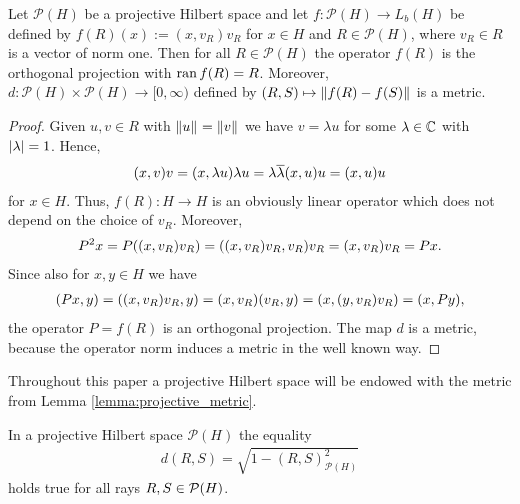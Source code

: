 \begin{lemma} \label{lemma:projective_metric}
	Let $\mathcal{P}(H)$ be a projective Hilbert space and let $f: \mathcal{P}(H) \to L_b(H)$ be defined by $f(R)(x) := (x,v_R)v_R$ for $x \in H$ and $R \in \mathcal{P}(H)$, where $v_R \in R$ is a vector of norm one. Then for all $R \in \mathcal{P}(H)$ the operator $f(R)$ is the orthogonal projection with $\operatorname{ran} f(R) = R$. Moreover, $d: \mathcal{P}(H) \times \mathcal{P}(H) \to [0, \infty)$ defined by $(R,S) \mapsto {\left \| f(R) - f(S) \right \|}_{}$ is a metric. 
\end{lemma}

\begin{proof}
	Given $u,v \in R$ with ${\left \| u \right \|}_{} = {\left \| v \right \|}_{}$ we have $v = \lambda u$ for some $\lambda \in \mathbb{C}$ with ${\left | \lambda \right |} = 1$. Hence,
	\begin{align*}
		{\left ( x,v \right )}v = {\left ( x, \lambda u \right )} \lambda u = \lambda \overline{\lambda} {\left ( x, u \right )} u = {\left ( x, u \right )} u 
	\end{align*}
	for $x \in H$. Thus, $f(R): H \to H$ is an obviously linear operator which does not depend on the choice of $v_R$. Moreover,
	\begin{align*}
		P^2x = P{\left ( (x, v_R) v_R \right )} = {\left ( (x, v_R) v_R, v_R \right )} v_R = (x,v_R) v_R = Px.
	\end{align*}
	Since also for $x,y \in H$ we have
	\begin{align*}
		(Px, y) = {\left ( (x, v_R) v_R, y \right )} = (x, v_R) (v_R, y) = {\left ( x, (y, v_R) v_R \right )} = (x, Py),
	\end{align*}
	the operator $P = f(R)$ is an orthogonal projection. The map $d$ is a metric, because the operator norm induces a metric in the well known way. 
\end{proof}


\begin{remark}
	Throughout this paper a projective Hilbert space will be endowed with the metric from Lemma \ref{lemma:projective_metric}. 
\end{remark}


\begin{lemma} \label{lemma:metric_representation}
	In a projective Hilbert space $\mathcal{P}(H)$ the equality 
	\begin{align*}
		d(R,S) = \sqrt{1 - (R,S)_{\mathcal{P}(H)}^2}
	\end{align*}
	holds true for all rays $R, S \in \mathcal{P}{\left ( H \right )}$.
\end{lemma}


